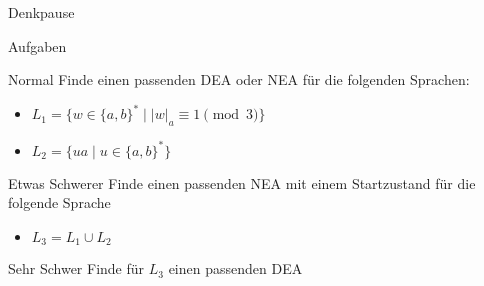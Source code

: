 {
\begin{frame}{Denkpause}
    \footnotesize
    \begin{alertblock}{Aufgaben}
    \end{alertblock}
    \begin{block}{Normal}
        Finde einen passenden DEA oder NEA für die folgenden Sprachen:
        \begin{itemize}
            \item $L_1 = \{w \in \{a,b\}^* \mid |w|_a \equiv 1 \pmod{3}\}$
            \item $L_2 = \{ua\mid u \in \{a,b\}^*\}$
        \end{itemize}
    \end{block}
    \begin{block}{Etwas Schwerer}
        Finde einen passenden NEA mit \alert{einem} Startzustand für die folgende Sprache
        \begin{itemize}
            \item $L_3 = L_1 \cup L_2$
        \end{itemize}
    \end{block}
    \begin{block}{Sehr Schwer}
        Finde für $L_3$ einen passenden DEA
    \end{block}
\end{frame}
}

